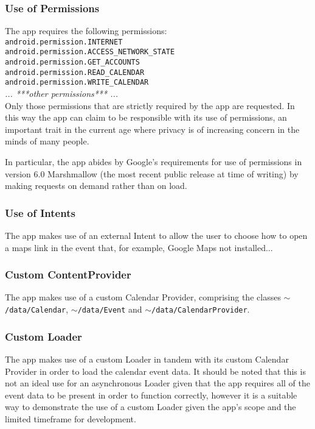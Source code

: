 \documentclass{article}
\def\code#1{\texttt{#1}} %
\begin{document}
\subsubsection{Use of Permissions}
The app requires the following permissions:\\
    \newline
    \indent \code{android.permission.INTERNET}\\
    \indent \code{android.permission.ACCESS\_NETWORK\_STATE}\\
    \indent \code{android.permission.GET\_ACCOUNTS}\\
    \indent \code{android.permission.READ\_CALENDAR}\\
    \indent \code{android.permission.WRITE\_CALENDAR}\\
    \indent \emph{... ***other permissions*** ...}\\
    \newline
Only those permissions that are strictly required by the app are requested. In this way the app can claim to be responsible with its use of permissions, an important trait in the current age where privacy is of increasing concern in the minds of many people. 

In particular, the app abides by Google's requirements for use of permissions in version 6.0 Marshmallow (the most recent public release at time of writing) by making requests on demand rather than on load.

\subsubsection{Use of Intents}
The app makes use of an external Intent to allow the user to choose how to open a maps link in the event that, for example, Google Maps not installed...
\subsubsection{Custom ContentProvider}
The app makes use of a custom Calendar Provider, comprising the classes \code{$\mathtt{\sim}$/data/Calendar}, \code{$\mathtt{\sim}$/data/Event} and \code{$\mathtt{\sim}$/data/CalendarProvider}.
\subsubsection{Custom Loader}
The app makes use of a custom Loader in tandem with its custom Calendar Provider in order to load the calendar event data. It should be noted that this is not an ideal use for an asynchronous Loader given that the app requires all of the event data to be present in order to function correctly, however it is a suitable way to demonstrate the use of a custom Loader given the app's scope and the limited timeframe for development.
\end{document}
